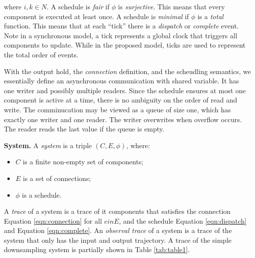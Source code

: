 where $i,k\in N$.
A schedule is \emph{fair} if $\phi$ is \emph{surjective}. This means that every component is executed at least once.
A schedule is \emph{minimal} if $\phi$ is a \emph{total} function. This means that at each ``tick'' there is a \emph{dispatch} or \emph{complete} event. Note in a synchronous model, a tick represents a global clock that triggers all components to update. While in the proposed model, ticks are used to represent the total order of events. 

With the output hold, the \emph{connection} definition, and the scheudling semantics, we essentially define an asynchronous communication with shared variable. It has one writer and possibly multiple readers. Since the schedule ensures at most one component is active at a time, there is no ambiguity on the order of read and write. The comminucation may be viewed as a queue of size one, which has exactly one writer and one reader. The writer overwrites when overflow occurs. The reader reads the last value if the queue is empty.

{\bf System.}
A \emph{system} is a triple $(C, E, \phi)$, where:
\begin{itemize}
    	\item $C$ is a finite non-empty set of components;
    	\item $E$ is a set of connections;
    	\item $\phi$ is a schedule.
\end{itemize}
A \emph{trace} of a system is a trace of it components that satisfies the connection Equation \ref{eqn:connection} for all $e in E$, and the schedule Equation \ref{eqn:dispatch} and Equation \ref{eqn:complete}.
An \emph{observal trace} of a system is a trace of the system that only has the input and output trajectory.
A trace of the simple downsampling system is partially shown in Table \ref{tab:table1}.

